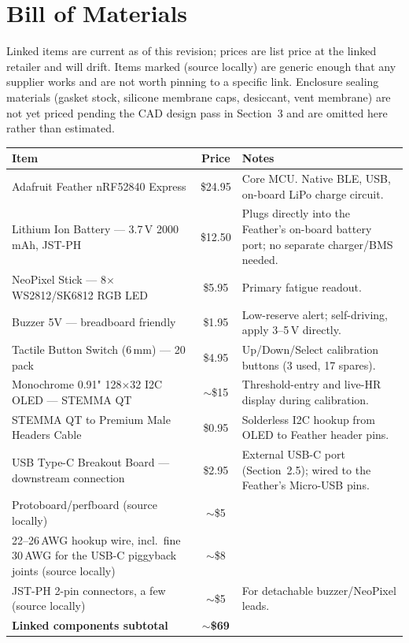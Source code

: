 \documentclass[11pt]{article}
\begin{document}
\section{Bill of Materials}
Linked items are current as of this revision; prices are list price at the linked retailer and will drift. Items marked (source locally) are generic enough that any supplier works and are not worth pinning to a specific link. Enclosure sealing materials (gasket stock, silicone membrane caps, desiccant, vent membrane) are not yet priced pending the CAD design pass in Section~3 and are omitted here rather than estimated.

\begin{center}
\begin{tabular}{L{6.2cm} c L{6cm}}
\toprule
\textbf{Item} & \textbf{Price} & \textbf{Notes} \\
\midrule
Adafruit Feather nRF52840 Express & \$24.95 & Core MCU. Native BLE, USB, on-board LiPo charge circuit. \\
Lithium Ion Battery --- 3.7\,V 2000\,mAh, JST-PH & \$12.50 & Plugs directly into the Feather's on-board battery port; no separate charger/BMS needed. \\
NeoPixel Stick --- 8$\times$WS2812/SK6812 RGB LED & \$5.95 & Primary fatigue readout. \\
Buzzer 5V --- breadboard friendly & \$1.95 & Low-reserve alert; self-driving, apply 3--5\,V directly. \\
Tactile Button Switch (6\,mm) --- 20 pack & \$4.95 & Up/Down/Select calibration buttons (3 used, 17 spares). \\
Monochrome 0.91" 128$\times$32 I2C OLED --- STEMMA QT & $\sim$\$15 & Threshold-entry and live-HR display during calibration. \\
STEMMA QT to Premium Male Headers Cable & \$0.95 & Solderless I2C hookup from OLED to Feather header pins. \\
USB Type-C Breakout Board --- downstream connection & \$2.95 & External USB-C port (Section~2.5); wired to the Feather's Micro-USB pins. \\
Protoboard/perfboard (source locally) & $\sim$\$5 & \\
22--26\,AWG hookup wire, incl.\ fine 30\,AWG for the USB-C piggyback joints (source locally) & $\sim$\$8 & \\
JST-PH 2-pin connectors, a few (source locally) & $\sim$\$5 & For detachable buzzer/NeoPixel leads. \\
\midrule
\textbf{Linked components subtotal} & $\sim$\textbf{\$69} & \\
\bottomrule
\end{tabular}
\end{center}
\end{document}
